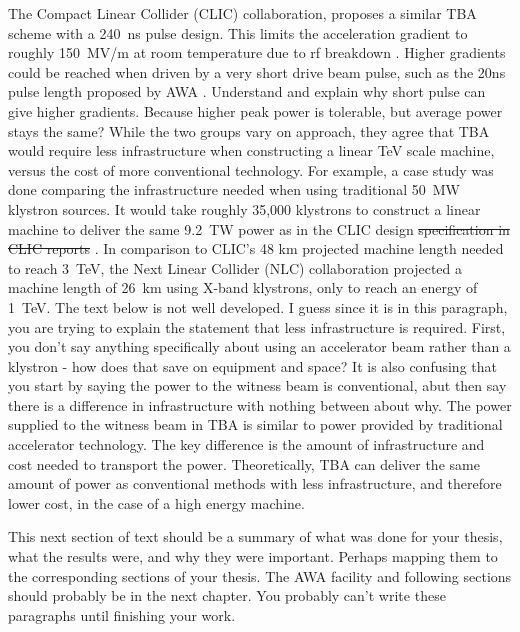 \documentclass{iitthesis}
\newcommand{\lsnote}[1]{\textsf{{\color{violet}{ LS note:}   #1 }}}
\newcommand{\nrnote}[1]{\textsf{{\color{blue}{ NN note:}   #1 }}}
\begin{document}
The Compact Linear Collider (CLIC) collaboration, proposes a similar TBA scheme with
a \SI{240}{ns} pulse design. This limits the acceleration gradient
to roughly \SI{150}{MV/m} at room temperature due to rf breakdown \cite{CLICdesignReport}.
Higher gradients could be reached when driven by a very short drive
beam pulse, such as the 20ns pulse length proposed by AWA \cite{WeiPaper}. 
\nrnote{Understand and explain why short pulse can give higher gradients. 
Because higher peak power is tolerable, but average power stays the same?}
While the two groups vary on approach, they agree that TBA would 
require less infrastructure when constructing a linear TeV scale machine, 
versus the cost of more conventional technology. 
For example, a case study was done \lsnote{comparing the infrastructure needed when} using traditional \SI{50}{MW} klystron sources.
It would take roughly 35,000 klystrons to construct a linear machine to deliver the same 
\SI{9.2}{TW} power \lsnote{as in the CLIC design \sout{specification in CLIC reports}} \cite{CLICdesignReport}. 
In comparison to CLIC's 48 km projected \lsnote{machine} length \lsnote{needed} to reach \SI{3}{TeV}, the Next Linear
Collider (NLC) collaboration projected a \lsnote{machine} length of \SI{26}{km} using X-band klystrons,
only to reach an energy of \SI{1}{TeV}. %
\lsnote{The text below is not well developed.  I guess since it is in this paragraph, you are trying to explain the statement that less infrastructure is required.  First, you don't say anything specifically about using an accelerator beam rather than a klystron - how does that save on equipment and space?  It is also confusing that you start by saying the power to the witness beam is conventional, abut then say there is a difference in infrastructure with nothing between  about why.}
The power supplied to the witness beam in TBA is similar to
power provided by traditional accelerator technology. 
The key difference is the amount of infrastructure and cost 
needed to transport the power. Theoretically, TBA can deliver
the same amount of power as conventional methods with less 
infrastructure, and therefore lower cost, in the case of a high energy machine. 

\lsnote{This next section of text should be a summary of what was done for your thesis, what the results were, and why they were important. Perhaps mapping them to the corresponding sections of your thesis.  The AWA facility and following sections should probably be in the next chapter.  You probably can't write these paragraphs until finishing your work.}
\end{document}
